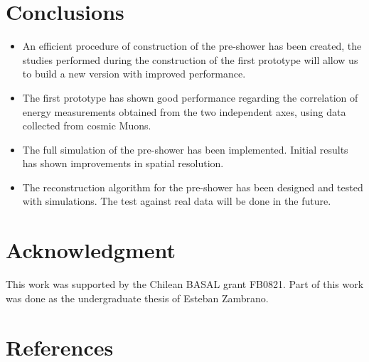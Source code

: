 \documentclass[final,5p,times,twocolumn]{elsarticle}
\begin{document}
\section{Conclusions}
\begin{itemize}
\item An efficient procedure of construction of the pre-shower has been created, the studies performed during the construction of the first prototype will allow us to build a new version with improved performance.
\item The first prototype has shown good performance regarding the correlation of energy measurements obtained from the two independent axes, using data collected from cosmic Muons.
\item The full simulation of the pre-shower has been implemented. Initial results has shown improvements in spatial resolution.
\item The reconstruction algorithm for the pre-shower has been designed and tested with simulations. The test against real data will be done in the future.
\end{itemize}
%
\section*{Acknowledgment}
This work was supported by the Chilean BASAL grant FB0821.
Part of this work was done as the undergraduate thesis of Esteban Zambrano.
\nocite{agostinelli2003geant4}
\nocite{preshower_proposal}
%
\section{References}


%
\end{document}
